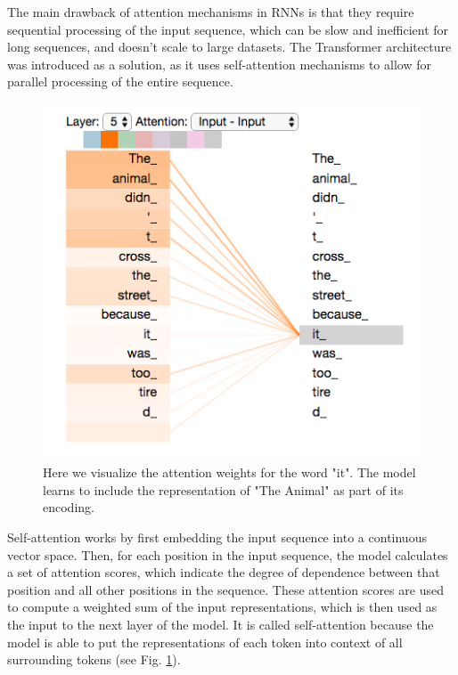 The main drawback of attention mechanisms in RNNs is that they require sequential processing of the input sequence, which can be slow and inefficient for long sequences, and doesn't scale to large datasets.
The Transformer architecture was introduced as a solution, as it uses self-attention mechanisms to allow for parallel processing of the entire sequence.

\begin{figure}[h]
    \includegraphics[width=\linewidth]{chapters/NLP/figures/self-attention.png}
    \caption{Here we visualize the attention weights for the word "it". The model learns to include the representation of "The Animal" as part of its encoding.}
    \label{fig:self-attention}
\end{figure}

Self-attention works by first embedding the input sequence into a continuous vector space. Then, for each position in the input sequence, the model calculates a set of attention scores, which indicate the degree of dependence between that position and all other positions in the sequence. These attention scores are used to compute a weighted sum of the input representations, which is then used as the input to the next layer of the model.
It is called self-attention because the model is able to put the representations of each token into context of all surrounding tokens (see Fig. \ref{fig:self-attention}).

